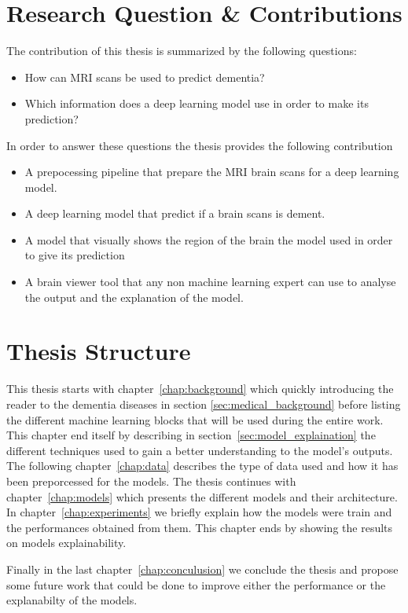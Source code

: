 \section{Research Question & Contributions}
The contribution of this thesis is summarized by the following questions:
\begin{itemize}
    \item How can MRI scans be used to predict dementia?
    \item Which information does a deep learning model use in order to make its prediction? 
\end{itemize}

In order to answer these questions the thesis provides the following contribution
\begin{itemize}
    \item A prepocessing pipeline that prepare the MRI brain scans for a deep learning model.
    \item A deep learning model that predict if a brain scans is dement.
    \item A model that visually shows the region of the brain the model used in order to give its prediction
    \item A brain viewer tool that any non machine learning expert can use to analyse the output and the explanation of the model.  
\end{itemize}



\section{Thesis Structure}
\label{sec:structure}
This thesis starts with chapter~\ref{chap:background} which quickly introducing the reader to the dementia diseases in section \ref{sec:medical_background} before listing the different machine learning blocks that will be used during the entire work. This chapter end itself by describing in section~\ref{sec:model_explaination} the different techniques used to gain a better understanding to the model's outputs. The following chapter~\ref{chap:data} describes the type of data used and how it has been preporcessed for the models. The thesis continues with chapter~\ref{chap:models} which presents the different models and their architecture. 
In chapter~\ref{chap:experiments} we briefly explain how the models were train and the performances obtained from them. This chapter ends by showing the results on models explainability.

Finally in the last chapter~\ref{chap:conculusion} we conclude the thesis and propose some future work that could be done to improve either the performance or the explanabilty of the models.
